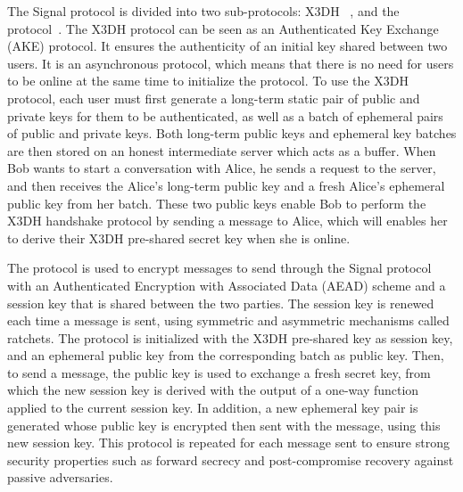 
The Signal protocol is divided into two sub-protocols: X3DH ~\cite{X3DH}, and the \dr protocol~\cite{double_ratchet}.
The X3DH protocol can be seen as an Authenticated Key Exchange (AKE) protocol. It ensures the authenticity of an initial key shared between two users. It is an asynchronous protocol, which means that there is no need for users to be online at the same time to initialize the protocol. To use the X3DH protocol, each user must first generate a long-term static pair of public and private keys for them to be authenticated, as well as a batch of ephemeral pairs of public and private keys. Both long-term public keys and ephemeral key batches are then stored on an honest intermediate server which acts as a buffer. When Bob wants to start a conversation with Alice, he sends a request to the server, and then receives the Alice's long-term public key and a fresh Alice's ephemeral public key from her batch. These two public keys enable Bob to perform the X3DH handshake protocol by sending a message to Alice, which will enables her to derive their X3DH pre-shared secret key when she is online.

The \dr protocol is used to encrypt messages to send through the Signal protocol with an Authenticated Encryption with Associated Data (AEAD) scheme and a session key that is shared between the two parties. The session key is renewed each time a message is sent, using symmetric and asymmetric mechanisms called ratchets. The \dr protocol is initialized with the X3DH pre-shared key as session key, and an ephemeral public key from the corresponding batch as public key. Then, to send a message, the public key is used to exchange a fresh secret key, from which the new session key is derived with the output of a one-way function applied to the current session key. In addition, a new ephemeral key pair is generated whose public key is encrypted then sent with the message, using this new session key. This protocol is repeated for each message sent to ensure strong security properties such as forward secrecy and post-compromise recovery against passive adversaries.

